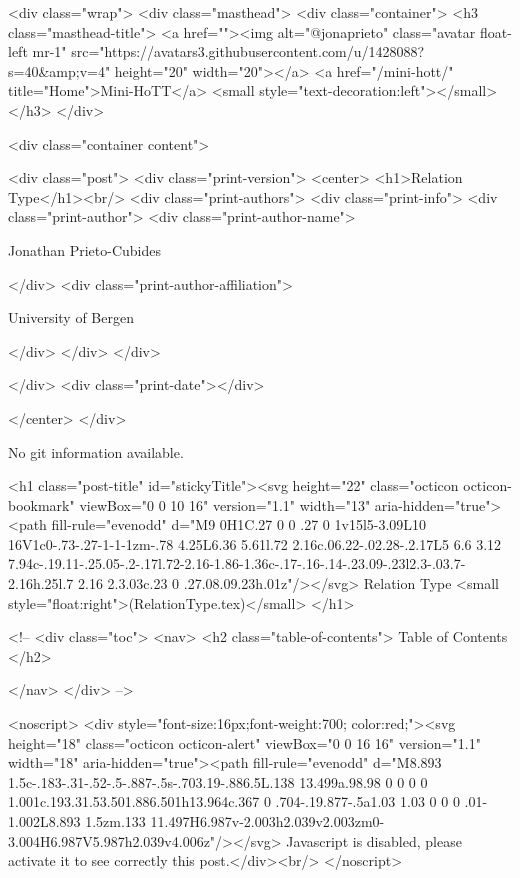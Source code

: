     <div class="wrap">
      <div class="masthead">
        <div class="container">
          <h3 class="masthead-title">
            <a href=""><img alt="@jonaprieto" class="avatar float-left mr-1" src="https://avatars3.githubusercontent.com/u/1428088?s=40&amp;v=4" height="20" width="20"></a>
            <a href="/mini-hott/" title="Home">Mini-HoTT</a>
            <small style="text-decoration:left"></small>
          </h3>
        </div>
      
      <div class="container content">
        







<div class="post">
  <div class="print-version">
    <center>
      <h1>Relation Type</h1><br/>
        <div class="print-authors">
          <div class="print-info">
            <div class="print-author">
              <div class="print-author-name">
                
                  Jonathan Prieto-Cubides
                
              </div>
              <div class="print-author-affiliation">
                
                  University of Bergen
                
                </div>
            </div>
          </div>
          
          
        </div>
        <div class="print-date"></div>
        
        
    </center>
  </div>

  
  No git information available.
  

  <h1 class="post-title" id="stickyTitle"><svg height="22" class="octicon octicon-bookmark" viewBox="0 0 10 16" version="1.1" width="13" aria-hidden="true"><path fill-rule="evenodd" d="M9 0H1C.27 0 0 .27 0 1v15l5-3.09L10 16V1c0-.73-.27-1-1-1zm-.78 4.25L6.36 5.61l.72 2.16c.06.22-.02.28-.2.17L5 6.6 3.12 7.94c-.19.11-.25.05-.2-.17l.72-2.16-1.86-1.36c-.17-.16-.14-.23.09-.23l2.3-.03.7-2.16h.25l.7 2.16 2.3.03c.23 0 .27.08.09.23h.01z"/></svg> Relation Type <small style="float:right">(RelationType.tex)</small>
  </h1>

  <!-- 
  <div class="toc">
    <nav>
    <h2 class="table-of-contents"> Table of Contents </h2>
      

    </nav>
  </div>
   -->

  <noscript>
  <div style="font-size:16px;font-weight:700; color:red;"><svg height="18" class="octicon octicon-alert" viewBox="0 0 16 16" version="1.1" width="18" aria-hidden="true"><path fill-rule="evenodd" d="M8.893 1.5c-.183-.31-.52-.5-.887-.5s-.703.19-.886.5L.138 13.499a.98.98 0 0 0 0 1.001c.193.31.53.501.886.501h13.964c.367 0 .704-.19.877-.5a1.03 1.03 0 0 0 .01-1.002L8.893 1.5zm.133 11.497H6.987v-2.003h2.039v2.003zm0-3.004H6.987V5.987h2.039v4.006z"/></svg> Javascript is disabled, please activate it to see correctly this post.</div><br/>
  </noscript>

